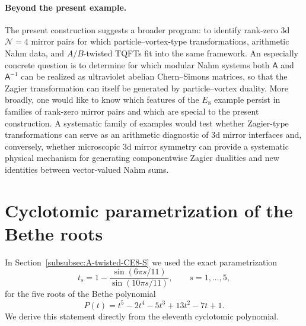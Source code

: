 \documentclass[11pt,a4paper]{article}
\numberwithin{equation}{section}
\begin{document}
\paragraph{Beyond the present example.}
The present construction suggests a broader program: to identify rank-zero 3d $\mathcal N=4$ mirror pairs for which particle--vortex-type transformations, arithmetic Nahm data, and $A/B$-twisted TQFTs fit into the same framework.  An especially concrete question is to determine for which modular Nahm systems both $\mathsf A$ and $\mathsf A^{-1}$ can be realized as ultraviolet abelian Chern--Simons matrices, so that the Zagier transformation can itself be generated by particle--vortex duality.  More broadly, one would like to know which features of the $E_8$ example persist in families of rank-zero mirror pairs and which are special to the present construction.  A systematic family of examples would test whether Zagier-type transformations can serve as an arithmetic diagnostic of 3d mirror interfaces and, conversely, whether microscopic 3d mirror symmetry can provide a systematic physical mechanism for generating componentwise Zagier dualities and new identities between vector-valued Nahm sums.

\appendix
\section{Cyclotomic parametrization of the Bethe roots}
\label{app:cyclotomic-Bethe-roots}

In Section~\ref{subsubsec:A-twisted-CE8-S} we used the exact parametrization
\begin{equation}
  t_s
  =1-\frac{\sin(6\pi s/11)}{\sin(10\pi s/11)},
  \qquad s=1,\ldots,5,
  \label{eq:app-ts-definition}
\end{equation}
for the five roots of the Bethe polynomial
\begin{equation}
  P(t)=t^5-2t^4-5t^3+13t^2-7t+1.
  \label{eq:app-Bethe-polynomial}
\end{equation}
We derive this statement directly from the eleventh cyclotomic polynomial.
\end{document}
